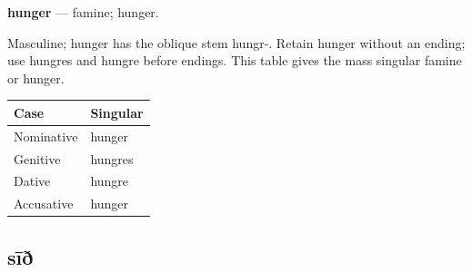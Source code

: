 \par\begin{minipage}{\linewidth}\raggedright
\textbf{hunger} — famine; hunger.

Masculine; hunger has the oblique stem hungr-. Retain hunger without an ending; use hungres and hungre before endings. This table gives the mass singular famine or hunger.

\par\begingroup
\fontsize{10.5}{13.2}\selectfont
\setlength{\LTleft}{0pt}\setlength{\LTright}{\fill}
\noindent
\begin{tabular}{@{}>{\raggedright\arraybackslash}p{60.59mm}>{\raggedright\arraybackslash}p{60.59mm}@{}}
\toprule
\textbf{Case} & \textbf{Singular} \\
\midrule
Nominative & hunger \\
Genitive & hungres \\
Dative & hungre \\
Accusative & hunger \\
\bottomrule
\end{tabular}
\par\endgroup

\end{minipage}\par
{}
\subsection*{sīð}

